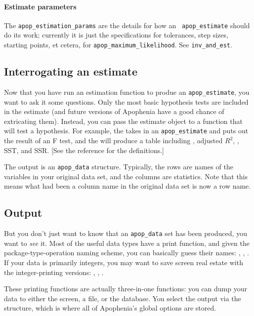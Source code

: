 \paragraph{Estimate parameters}
The {\tt apop\_estimation\_params} are the details for how an {\tt
apop\_estimate} should do its work; currently it is just the specifications
for tolerances, step sizes, starting points, et cetera, for {\tt apop\_max\-i\-mum\_like\-li\-hood}.
 See {\tt inv\_and\_est}.

\subsection{Interrogating an estimate}
Now that you have run an estimation function to produe an 
{\tt apop\_\-estimate}, you want to ask it some questions. Only the most
basic hypothesis tests are included in the estimate (and future versions
of Apophenia have a good chance of extricating them). Instead, you can
pass the estimate object to a function that will test a hypothesis. For
example, the  takes in an 
{\tt apop\_\-estimate} and puts out the result of an F test, and the
 will produce a
table including , adjusted $R^2$, , SST, and SSR. [See the
reference for the definitions.]

The output is an {\tt apop\_\-data} structure. Typically, the rows are
names of the variables in your original data set, and the columns are
statistics. Note that this means what had been a column name in the 
original data set is now a row name.


\subsection{Output} 
But you don't just want to know that an {\tt apop\_\-data} set has been
produced, you want to {\sl see} it.  Most of the useful data types have
a print function, and given the package-type-operation naming scheme,
you can basically guess their names: ,
, . If your
data is primarily integers, you may want to save screen real estate
with the integer-printing versions: ,
, .

These printing functions are actually three-in-one functions: you can
dump your data to either the screen, a file, or the database. You select
the output via the  structure, which is where all of
Apophenia's global options are stored. 

